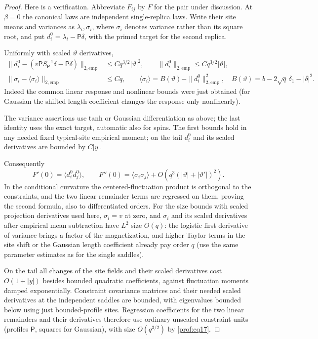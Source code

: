 \begin{proof}
Here is a verification. Abbreviate \(F_{ij}\) by \(F\) for the
pair under discussion. At \(\beta=0\) the canonical laws are
independent single-replica laws. Write their site means and
variances as \(\lambda_i,\sigma_i\), where \(\sigma_i\) denotes
variance rather than its square root, and put
\(d_i^0=\lambda_i-\mathsf P\delta\), with the primed target for
the second replica.

Uniformly with scaled \(\vartheta\) derivatives,
\begin{equation}\label{prof:eq17}
\begin{split}
 \|d_i^0-(v\mathsf P S_{\mathsf P}^{-1}\delta-\mathsf P\delta)\|_{2,\mathrm{emp}}
     &\le C q^{3/2}|\vartheta|^2,\qquad
 \|d_i^0\|_{2,\mathrm{emp}}\le C q^{3/2}|\vartheta|,\\
 \|\sigma_i-\langle\sigma_i\rangle\|_{2,\mathrm{emp}}&\le Cq,\qquad
 \langle\sigma_i\rangle=B(\vartheta)-\|d_i^0\|_{2,\mathrm{emp}}^2,\quad
 B(\vartheta)=b-2\sqrt q\,\delta_1-|\delta|^2 .
 \end{split}
\end{equation}
Indeed the common linear response and nonlinear bounds were just obtained (for Gaussian the shifted length coefficient changes the response only nonlinearly).

The variance assertions use tanh or Gaussian differentiation as above; the last identity uses the exact target, automatic also for spins. The first bounds hold in any needed fixed typical-site empirical moment; on the tail \(d_i^0\) and its scaled derivatives are bounded by \(C |y|\).

Consequently
\[
 F'(0)=\langle d_i^0 d_j^0\rangle,\qquad
 F''(0)=\langle\sigma_i\sigma_j\rangle+O(q^3(|\vartheta|+|\vartheta'|)^2).
\]
In the conditional curvature the centered-fluctuation product is orthogonal to the constraints, and the two linear remainder terms are regressed on them, proving the second formula, also to differentiated orders. For the size bounds with scaled projection derivatives used here, \(\sigma_i=v\) at zero, and \(\sigma_i\) and its scaled derivatives after empirical mean subtraction have \(L^2\) size \(O(q)\): the logistic first derivative of variance brings a factor of the magnetization, and higher Taylor terms in the site shift or the Gaussian length coefficient already pay order \(q\) (use the same parameter estimates as for the single saddles).

On the tail all changes of the site fields and their scaled derivatives cost \(O(1+|y|)\) besides bounded quadratic coefficients, against fluctuation moments damped exponentially. Constraint covariance matrices and their needed scaled derivatives at the independent saddles are bounded, with eigenvalues bounded below using just bounded-profile sites. Regression coefficients for the two linear remainders and their derivatives therefore use ordinary unscaled constraint units (profiles \(\mathsf P\), squares for Gaussian), with size \(O(q^{3/2})\) by \eqref{prof:eq17}.


\end{proof}
